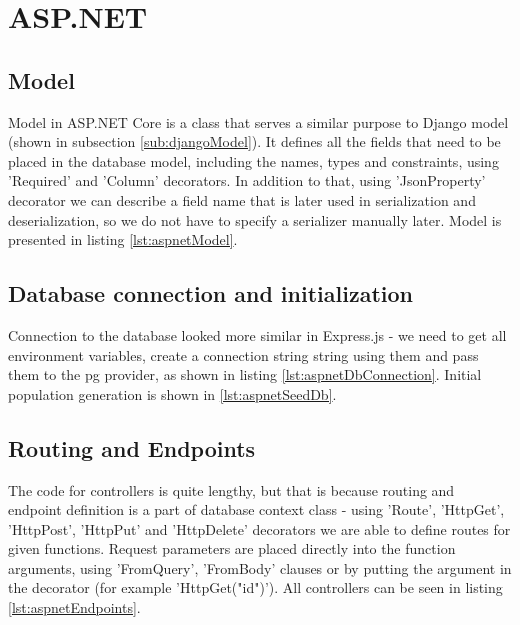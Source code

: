 %
%
\section{ASP.NET}
\subsection{Model}
Model in ASP.NET Core is a class that serves a similar purpose to Django model (shown in subsection \ref{sub:djangoModel}). It defines all the fields that need to be placed in the database model, including the names, types and constraints, using 'Required' and 'Column' decorators. In addition to that, using 'JsonProperty' decorator we can describe a field name that is later used in serialization and deserialization, so we do not have to specify a serializer manually later. Model is presented in listing \ref{lst:aspnetModel}.


\subsection{Database connection and initialization}
Connection to the database looked more similar in Express.js - we need to get all environment variables, create a connection string string using them and pass them to the \acrlong{pg} provider, as shown in listing \ref{lst:aspnetDbConnection}. Initial population generation is shown in \ref{lst:aspnetSeedDb}.



\subsection{Routing and Endpoints}
The code for controllers is quite lengthy, but that is because routing and endpoint definition is a part of database context class - using 'Route', 'HttpGet', 'HttpPost', 'HttpPut' and 'HttpDelete' decorators we are able to define routes for given functions. Request parameters are placed directly into the function arguments, using 'FromQuery', 'FromBody' clauses or by putting the argument in the decorator (for example 'HttpGet("{id}")'). All controllers can be seen in listing \ref{lst:aspnetEndpoints}.


%
%
